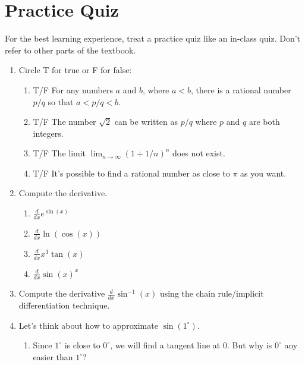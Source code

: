 \documentclass[11pt]{book}
\numberwithin{example}{chapter}
\begin{document}
\section{Practice Quiz}

For the best learning experience, treat a practice quiz like an in-class quiz. Don't refer to other parts of the textbook.

\begin{enumerate}


\item Circle T for true or F for false:
\begin{enumerate}
\item T/F For any numbers $a$ and $b$, where $a<b$, there is a rational number $p/q$ so that $a<p/q<b$.

\item T/F The number $\sqrt{2}$ can be written as $p/q$ where $p$ and $q$ are both integers.

\item T/F The limit $\lim_{n\to \infty} (1+1/n)^{n}$ does not exist.

\item T/F It's possible to find a rational number as close to $\pi$ as you want.

\end{enumerate}


\item Compute the derivative.  

\begin{enumerate}
\item
$\frac{d}{dx} e^{\sin(x)}$
\item
$\frac{d}{dx} \ln(\cos(x))$
\item
$\frac{d}{dx} x^3\tan(x)$
\item
$\frac{d}{dx} \sin(x)^x$
\end{enumerate}




\item
Compute the derivative $\frac{d}{dx} \sin^{-1}(x)$ using the chain rule/implicit differentiation technique.  



\item Let's think about how to approximate $\sin(1^\circ)$.

\begin{enumerate}


\item  Since $1^\circ$ is close to $0^\circ$, we will find a tangent line at 0.  But why is $0^\circ$ any easier than $1^\circ$?




\end{enumerate}
\end{enumerate}
\end{document}
